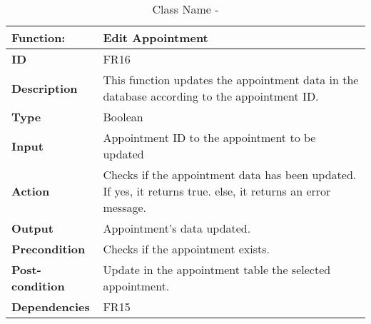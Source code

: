 \documentclass[]{article}
\begin{document}
\FloatBarrier
\begin{table}[h]
\caption{Class Name - }
\label{tab:my-table}
\begin{tabular}{|p{}|p{}|}
\hline
\textbf{Function:} & Edit Appointment
\\ \hline
\textbf{ID}  & FR16    

\\ \hline
\textbf{Description}    &  This function updates the appointment data in the database according to the appointment ID.                                                                   
\\ \hline
\textbf{Type}    &  Boolean       

\\ \hline
\textbf{Input}        & Appointment ID to the appointment to be updated


\\ \hline
\textbf{Action}            & Checks if the appointment data has been updated. If yes, it returns true. else, it returns an error message.

\\ \hline
\textbf{Output}            & Appointment's data updated.

\\ \hline
\textbf{Precondition}           &   Checks if the appointment exists.

\\ \hline
\textbf{Post-condition}           & Update in the appointment table the selected appointment.


\\ \hline
\textbf{Dependencies}           &FR15 
\\ \hline
\end{tabular}
\end{table}
\end{document}
